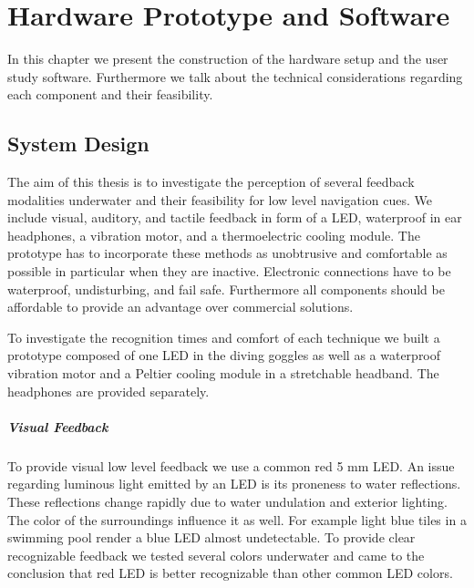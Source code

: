 %

\chapter{Hardware Prototype and Software }
\label{ownwork} 


In this chapter we present the construction of the hardware setup and the user study software. 
Furthermore we talk about the technical considerations regarding each component and their feasibility.


\section{System Design}
The aim of this thesis is to investigate the perception of several feedback modalities underwater and their feasibility for low level navigation cues.
We include visual, auditory, and tactile feedback in form of a LED, waterproof in ear headphones,  a vibration motor, and a thermoelectric cooling module.
The prototype has to incorporate these methods as unobtrusive and comfortable as possible in particular when they are  inactive. 
Electronic connections have to be waterproof, undisturbing, and fail safe.
Furthermore all components should be affordable to provide an advantage over commercial solutions.

To investigate the recognition times and comfort of each technique we built a prototype composed of one LED in the diving goggles as well as a waterproof vibration motor and a Peltier cooling module in a stretchable headband.
The headphones are provided separately.

\paragraph{Visual Feedback}

To provide visual low level feedback we use a common red 5 mm LED.
An issue regarding luminous light emitted by an LED is its proneness to water reflections.
These reflections change rapidly due to water undulation and exterior lighting.
The color of the surroundings influence it as well.
For example light blue tiles in a swimming pool render a blue LED almost undetectable.
To provide clear recognizable feedback we tested several colors underwater and came to the conclusion that red LED is better recognizable than other common LED colors.

